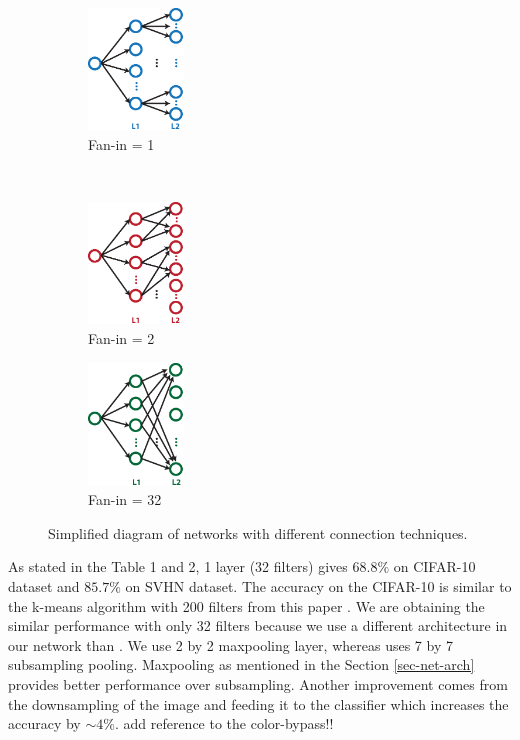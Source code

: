 \documentclass{article} %
\begin{document}
\begin{figure}
        \centering
         \label{fig-secondconnex}
        \begin{subfigure}[b]{0.3\textwidth}
                \centering
                \includegraphics[width=1.0in]{fig-diagram-fanin1.eps}
                \caption{Fan-in = 1}
        \end{subfigure}%
        ~%
          \begin{subfigure}[b]{0.3\textwidth}
                \centering
                \includegraphics[width=1.0in]{fig-diagram-fanin2.eps}
                \caption{Fan-in = 2}
        \end{subfigure}%
        \begin{subfigure}[b]{0.3\textwidth}
                \centering
                \includegraphics[width=1.0in]{fig-diagram-faninall.eps}
                \caption{Fan-in = 32}
        \end{subfigure}
        \caption{Simplified diagram of networks with different connection techniques.}
\end{figure}


As stated in the Table 1 and 2, 1 layer (32 filters) gives $68.8\%$ on CIFAR-10 dataset and  $85.7\%$ on SVHN dataset.  The accuracy on the CIFAR-10 is similar to the k-means algorithm with 200 filters from this paper
\cite{coates_analysis_2011}. We are obtaining the similar performance with only 32 filters because we use a different architecture in our network than \cite{coates_analysis_2011}. We use 2 by 2 maxpooling layer, whereas \cite{coates_analysis_2011} uses 7 by 7 subsampling pooling. Maxpooling as mentioned in the Section \ref{sec-net-arch} provides better performance over subsampling. Another improvement comes from the downsampling of the image and feeding it to the classifier which increases the accuracy by  $\sim 4\%$. add reference to the color-bypass!!
\end{document}

